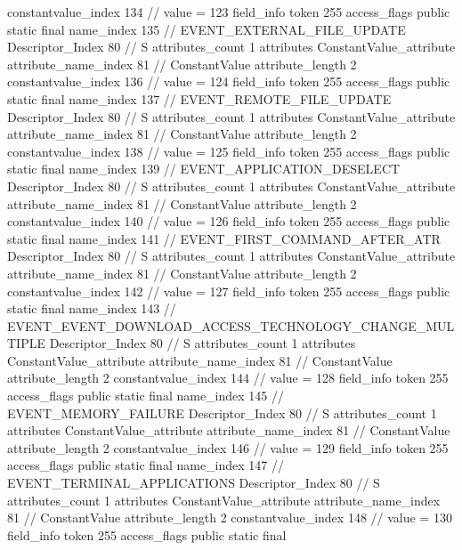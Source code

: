 {{{{{{{					constantvalue_index	134		// value = 123
				}
				}
			}
			field_info {
				token	255
				access_flags	public static final
				name_index	135		// EVENT_EXTERNAL_FILE_UPDATE
				Descriptor_Index	80		// S
				attributes_count	1
				attributes {
				ConstantValue_attribute {
					attribute_name_index	81		// ConstantValue
					attribute_length	2
					constantvalue_index	136		// value = 124
				}
				}
			}
			field_info {
				token	255
				access_flags	public static final
				name_index	137		// EVENT_REMOTE_FILE_UPDATE
				Descriptor_Index	80		// S
				attributes_count	1
				attributes {
				ConstantValue_attribute {
					attribute_name_index	81		// ConstantValue
					attribute_length	2
					constantvalue_index	138		// value = 125
				}
				}
			}
			field_info {
				token	255
				access_flags	public static final
				name_index	139		// EVENT_APPLICATION_DESELECT
				Descriptor_Index	80		// S
				attributes_count	1
				attributes {
				ConstantValue_attribute {
					attribute_name_index	81		// ConstantValue
					attribute_length	2
					constantvalue_index	140		// value = 126
				}
				}
			}
			field_info {
				token	255
				access_flags	public static final
				name_index	141		// EVENT_FIRST_COMMAND_AFTER_ATR
				Descriptor_Index	80		// S
				attributes_count	1
				attributes {
				ConstantValue_attribute {
					attribute_name_index	81		// ConstantValue
					attribute_length	2
					constantvalue_index	142		// value = 127
				}
				}
			}
			field_info {
				token	255
				access_flags	public static final
				name_index	143		// EVENT_EVENT_DOWNLOAD_ACCESS_TECHNOLOGY_CHANGE_MULTIPLE
				Descriptor_Index	80		// S
				attributes_count	1
				attributes {
				ConstantValue_attribute {
					attribute_name_index	81		// ConstantValue
					attribute_length	2
					constantvalue_index	144		// value = 128
				}
				}
			}
			field_info {
				token	255
				access_flags	public static final
				name_index	145		// EVENT_MEMORY_FAILURE
				Descriptor_Index	80		// S
				attributes_count	1
				attributes {
				ConstantValue_attribute {
					attribute_name_index	81		// ConstantValue
					attribute_length	2
					constantvalue_index	146		// value = 129
				}
				}
			}
			field_info {
				token	255
				access_flags	public static final
				name_index	147		// EVENT_TERMINAL_APPLICATIONS
				Descriptor_Index	80		// S
				attributes_count	1
				attributes {
				ConstantValue_attribute {
					attribute_name_index	81		// ConstantValue
					attribute_length	2
					constantvalue_index	148		// value = 130
				}
				}
			}
			field_info {
				token	255
				access_flags	public static final
}}}}}

